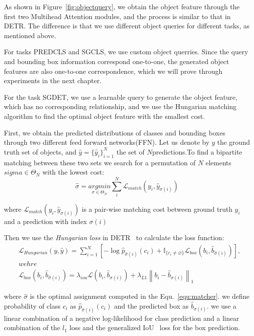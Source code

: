 As shown in Figure~\ref{fig:objectquery}, we obtain the object feature through the first two Multihead Attention modules, and the process is similar to that in DETR. The difference is that we use different object queries for different tasks, as mentioned above.

For tasks PREDCLS and SGCLS, we use custom object querries. Since the query and bounding box information correspond one-to-one, the generated object features are also one-to-one correspondence, which we will prove through experiments in the next chapter.

For the task SGDET, we use a learnable query to generate the object feature, which has no corresponding relationship, and we use the Hungarian matching algorithm to find the optimal object feature with the smallest cost.

First, we obtain the predicted distributions of classes and bounding boxes through two different feed forward networks(FFN). Let us denote by $ y $ the ground truth set of objects, and $  \hat{y}= \{ \hat{y}_i\} ^N_{i=1} $ the set of $ N  $predictions.To find a bipartite matching between these two sets we search for a permutation of $ N $ elements $sigma \in \Theta _N $ with the lowest cost:
\begin{equation}\label{equ:matcher}
 \hat{\sigma} = \underset{\sigma \in \Theta _N }{argmin} \sum_{i}^{N} \mathcal L_{match} (y_i,\hat{y}_{\sigma(i)})
\end{equation}

where $\mathcal L_{match} (y_i,\hat{y}_{\sigma(i)})$ is a pair-wise matching cost between ground truth $ y_i $ and a prediction with index $ \sigma(i) $

Then we use the \textit{Hungarian loss }in DETR~\cite{carion2020end} to calculate the loss function:
\begin{equation}\label{equ:hungarianloss}
	\begin{aligned}
	&\mathcal L_{Hungarian}(y,\hat{y} ) = \sum^{N}_{i=1}[-\log{\hat{p}_{\hat{\sigma}(i)}(c_i)} + \mathbb{I}_{\{c_i \ne  \varnothing \}}\mathcal{L}_{box}(b_i,\hat{b}_{\hat{\sigma}(i)})   ], \\
	&wehre \\
	&\mathcal{L}_{box}(b_i,\hat{b}_{\hat{\sigma}(i)}) = \lambda_{iou}\mathcal{L}(b_i,\hat{b}_{\sigma(i)}) + \lambda_{L1}\left \| b_i - \hat{b}_{\sigma (i)}  \right \| _1
	\end{aligned}
\end{equation}

where $ \hat{\sigma} $ is the optimal assignment computed in the Equ.~\ref{equ:matcher}. we define probability of class $ c_i $ as $ \hat{p}_{\hat{\sigma}(i)}(c_i)$ and the predicted box as $ \hat{b}_{\sigma(i)} $. we use a linear combination of a negative log-likelihood for class prediction and a linear combination of the $  l_1  $ loss and the generalized IoU~\cite{rezatofighi2019generalized} loss for the box prediction.


